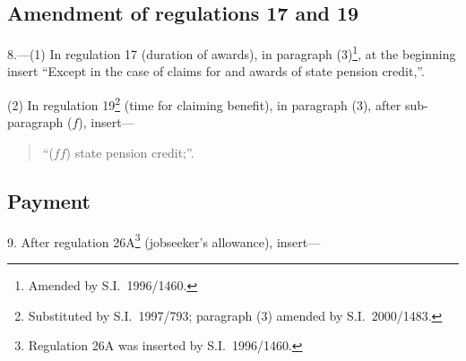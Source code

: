 \documentclass[12pt,a4paper]{article}
\begin{document}
\subsection[8. Amendment of regulations 17 and 19]{Amendment of regulations 17 and 19}

8.---(1)  In regulation 17 (duration of awards), in paragraph (3)\footnote{Amended by S.I.\ 1996/1460.}, at the beginning insert “Except in the case of claims for and awards of state pension credit,”.

(2) In regulation 19\footnote{Substituted by S.I.\ 1997/793; paragraph (3) amended by S.I.\ 2000/1483.} (time for claiming benefit), in paragraph (3), after sub-paragraph ($f$), insert—
\begin{quotation}
“($ff$) state pension credit;”.
\end{quotation}

\subsection[9. Payment]{Payment}

9.  After regulation 26A\footnote{Regulation 26A was inserted by S.I.\ 1996/1460.} (jobseeker’s allowance), insert—
\end{document}

